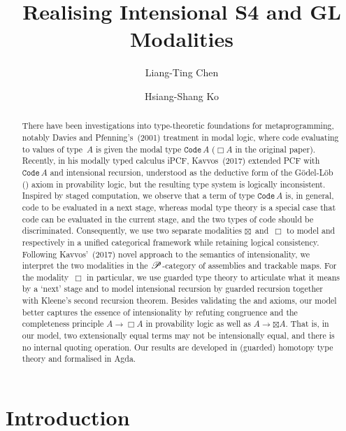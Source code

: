 \documentclass[a4paper,UKenglish,numberwithinsect,cleveref,thm-restate,draft]{lipics-v2021}
\title{Realising Intensional S4 and GL Modalities}
\author{Liang-Ting Chen}%
  {Institute of Information Science, Academia Sinica, Taiwan~\url{https://l-tchen.github.io}}%
  {liang.ting.chen.tw@gmail.com}%
  {https://orcid.org/0000-0002-3250-1331}{}
\author{Hsiang-Shang Ko}%
  {Institute of Information Science, Academia Sinica, Taiwan~\url{https://josh-hs-ko.github.io}}%
  {joshko@iis.sinica.edu.tw}%
  {https://orcid.org/0000-0002-2439-1048}{}
\numberwithin{equation}{section}
\theoremstyle{definition}
\theoremstyle{plain}
\begin{document}
\maketitle

\begin{abstract}

There have been investigations into type-theoretic foundations for metaprogramming, notably Davies and Pfenning's~(2001) treatment in \SFour modal logic, where code evaluating to values of type~$A$ is given the modal type $\mathtt{Code}\,A$ ($\Box A$ in the original paper).
Recently, in his modally typed calculus iPCF, Kavvos~(2017) extended PCF with $\mathtt{Code}\,A$ and intensional recursion, understood as the deductive form of the Gödel-Löb (\GL) axiom in provability logic, but the resulting type system is logically inconsistent.
Inspired by staged computation, we observe that a term of type $\mathtt{Code}\,A$ is, in general, code to be evaluated in a next stage, whereas \SFour modal type theory is a special case that code can be evaluated in the current stage, and the two types of code should be discriminated.
Consequently, we use two separate modalities $\boxtimes$~and~$\Box$ to model \SFour and \GL respectively in a unified categorical framework while retaining logical consistency.
Following Kavvos'~(2017) novel approach to the semantics of intensionality, we interpret the two modalities in the $\mathscr{P}$-category of assemblies and trackable maps.
For the \GL modality~$\Box$ in particular, we use guarded type theory to articulate what it means by a `next' stage and to model intensional recursion by guarded recursion together with Kleene's second recursion theorem.
Besides validating the \SFour and \GL axioms, our model better captures the essence of intensionality by refuting congruence and the completeness principle $A \to \Box A$ in provability logic as well as $A \to \boxtimes A$.
That is, in our model, two extensionally equal terms may not be intensionally equal, and there is no internal quoting operation.
Our results are developed in (guarded) homotopy type theory and formalised in Agda.
\end{abstract}

\section{Introduction}\label{sec:intro}
\end{document}
